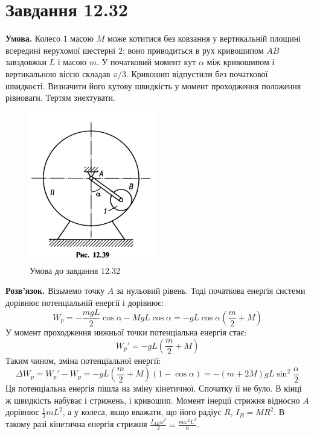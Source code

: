 \documentclass[14pt]{extarticle}
\begin{document}
\pagebreak
\section*{Завдання 12.32}

\textbf{Умова.} Колесо $1$ масою $M$ може котитися без ковзання у вертикальній площині всередині нерухомої шестерні $2$; воно приводиться в рух кривошипом $AB$ завздовжки $L$ і масою $m$. У початковий момент кут $\alpha$ між кривошипом і вертикальною віссю складав $\pi/3$. Кривошип відпустили без початкової швидкості. Визначити його кутову швидкість у момент проходження положення рівноваги. Тертям знехтувати.

\begin{figure}[H]
    \centering
    \includegraphics[width=0.5\textwidth]{images/hw_11/12-32.png}
    \caption{Умова до завдання 12.32}
    \label{fig:2}
\end{figure}

\textbf{Розв'язок.} Візьмемо точку $A$ за нульовий рівень. Тоді початкова енергія системи дорівнює потенціальній енергії і дорівнює:
\[
W_p = -\frac{mgL}{2}\cos\alpha - MgL \cos\alpha = -gL\cos\alpha\left(\frac{m}{2}+M\right)
\]
У момент проходження нижньої точки потенціальна енергія стає:
\[
W_p' = -gL\left(\frac{m}{2} + M\right)
\]
Таким чином, зміна потенціальної енергії:
\[
\Delta W_p = W_p' - W_p = -gL\left(\frac{m}{2}+M\right)(1-\cos\alpha) = -(m+2M)gL \sin^2 \frac{\alpha}{2}
\]
Ця потенціальна енергія пішла на зміну кінетичної. Спочатку її не було. В кінці ж швидкість набуває і стрижень, і кривошип. Момент інерції стрижня відносно $A$ дорівнює $\frac{1}{3}mL^2$, а у колеса, якщо вважати, що його радіус $R$, $I_{B} = MR^2$. В такому разі кінетична енергія стрижня $\frac{I_{AB}\omega^2}{2} = \frac{m\omega^2L^2}{6}$. 
\end{document}
